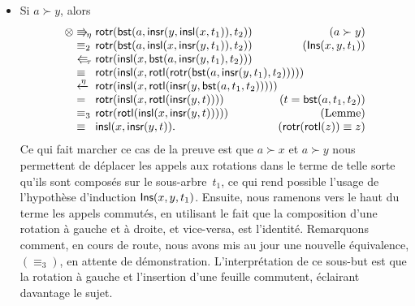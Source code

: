 \begin{itemize}
\begin{itemize}
    \item Si \(a \succ y\), alors
      \begin{equation*}
      \begin{array}{@{}r@{\;}l@{\;}l@{\hspace{-8mm}}r@{}}
        \otimes & \Rra{\eta} &
        \fun{rotr}(\fun{bst}(a,\fun{insr}(y,\fun{insl}(x,t_1)),t_2))
        & (a \succ y)\\
        & \equiv_2 & \fun{rotr}(\fun{bst}(a,\fun{insl}(x,  
        \fun{insr}(y,t_1)),t_2)) & (\pred{Ins}{x,y,t_1})\\
        & \Lla{\tau} & \fun{rotr}(\fun{insl}(x,
        \fun{bst}(a,\fun{insr}(y,t_1),t_2)))\\
        & \equiv & \fun{rotr}(\fun{insl}(x,
        \fun{rotl}(\fun{rotr}(\fun{bst}(a,\fun{insr}(y,t_1),t_2)))))\\
        & \xleftarrow{\smash{\eta}} &
        \fun{rotr}(\fun{insl}(x,\fun{rotl}(\fun{insr}(y, 
        \fun{bst}(a,t_1,t_2)))))\\
        & = & \fun{rotr}(\fun{insl}(x,\fun{rotl}(\fun{insr}(y,t))))
        & (t=\fun{bst}(a,t_1,t_2))\\
        & \equiv_3 & \fun{rotr}(\fun{rotl}(\fun{insl}(x, 
        \fun{insr}(y,t))))) & (\text{Lemme})\\
        & \equiv & \fun{insl}(x,\fun{insr}(y,t)).
        & (\fun{rotr}(\fun{rotl}(z)) \equiv z)
      \end{array}
      \end{equation*}
      Ce qui fait marcher ce cas de la preuve est que \(a \succ x\) et
      \(a \succ y\) nous permettent de déplacer les appels aux
      rotations dans le terme de telle sorte qu'ils sont composés sur
      le sous-arbre~\(t_1\), ce qui rend possible l'usage de
      l'hypothèse d'induction \(\textsf{Ins}({x,y,t_1})\). Ensuite, nous
      ramenons vers le haut du terme les appels commutés, en utilisant
      le fait que la composition d'une rotation à gauche et à droite,
      et vice-versa, est l'identité. Remarquons comment, en cours de
      route, nous avons mis au jour une nouvelle équivalence,
      \((\equiv_3)\), en attente de démonstration. L'interprétation de
      ce sous-but est que la rotation à gauche et l'insertion d'une
      feuille commutent, éclairant davantage le sujet.


\end{itemize}
\end{itemize}
